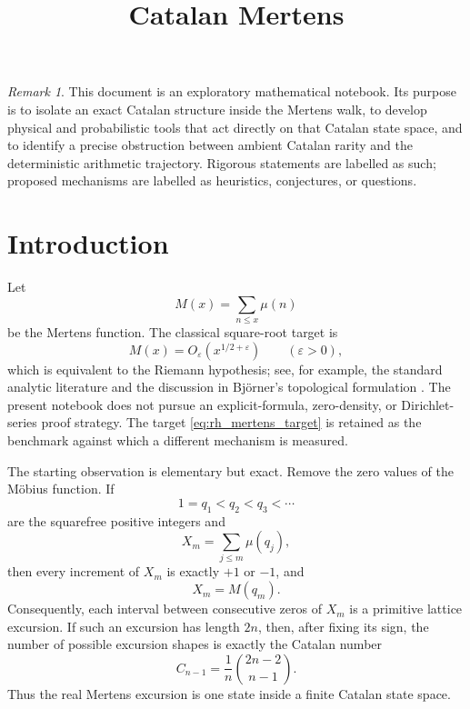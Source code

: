 \documentclass[11pt]{amsart}
\title{Catalan Mertens}
\author{}
\date{}
\numberwithin{equation}{section}
\theoremstyle{plain}
\theoremstyle{definition}
\theoremstyle{remark}
\newtheorem{remark}[theorem]{Remark}
\newcommand{\Mob}{\mu}
\newcommand{\Mert}{M}
\newcommand{\Cat}{C}
\newcommand{\eps}{\varepsilon}
\begin{document}
\maketitle
\tableofcontents
\bigskip

\begin{remark}
\label{rem:exploratory_nature}
This document is an exploratory mathematical notebook.  Its purpose is to isolate an exact Catalan structure inside the Mertens walk, to develop physical and probabilistic tools that act directly on that Catalan state space, and to identify a precise obstruction between ambient Catalan rarity and the deterministic arithmetic trajectory.  Rigorous statements are labelled as such; proposed mechanisms are labelled as heuristics, conjectures, or questions.
\end{remark}

\section{Introduction}
\label{sec:introduction}

Let
\begin{equation}
\Mert(x)=\sum_{n\le x}\Mob(n)
\label{eq:mertens_definition}
\end{equation}
be the Mertens function.  The classical square-root target is
\begin{equation}
\Mert(x)=O_{\eps}\!\left(x^{1/2+\eps}\right)
\qquad (\eps>0),
\label{eq:rh_mertens_target}
\end{equation}
which is equivalent to the Riemann hypothesis; see, for example, the standard analytic literature and the discussion in Bj\"orner's topological formulation \cite{Bjorner2011}.  The present notebook does not pursue an explicit-formula, zero-density, or Dirichlet-series proof strategy.  The target \eqref{eq:rh_mertens_target} is retained as the benchmark against which a different mechanism is measured.

The starting observation is elementary but exact.  Remove the zero values of the M\"obius function.  If
\begin{equation}
1=q_1<q_2<q_3<\cdots
\label{eq:squarefree_enumeration}
\end{equation}
are the squarefree positive integers and
\begin{equation}
X_m=\sum_{j\le m}\Mob(q_j),
\label{eq:compressed_walk}
\end{equation}
then every increment of $X_m$ is exactly $+1$ or $-1$, and
\begin{equation}
X_m=\Mert(q_m).
\label{eq:compressed_equals_mertens}
\end{equation}
Consequently, each interval between consecutive zeros of $X_m$ is a primitive lattice excursion.  If such an excursion has length $2n$, then, after fixing its sign, the number of possible excursion shapes is exactly the Catalan number
\begin{equation}
\Cat_{n-1}=\frac{1}{n}\binom{2n-2}{n-1}.
\label{eq:primitive_catalan_count_intro}
\end{equation}
Thus the real Mertens excursion is one state inside a finite Catalan state space.
\end{document}
